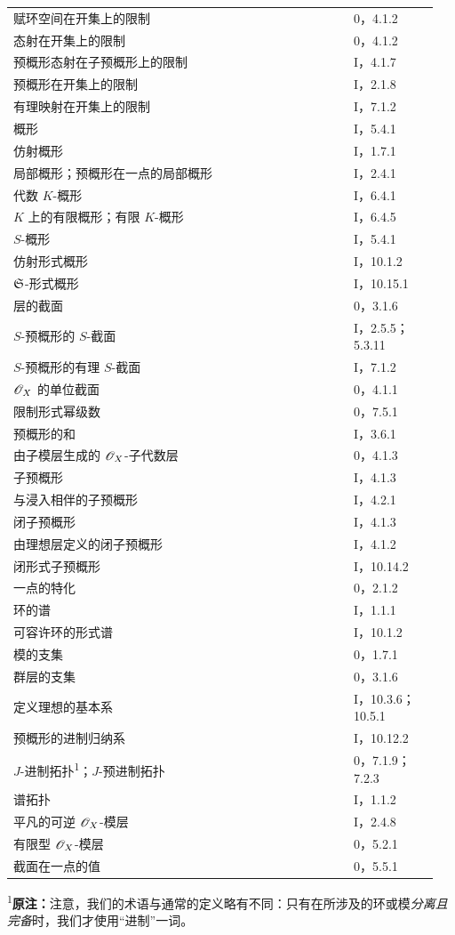 \begin{longtable}{@{}p{0.76\linewidth}p{0.19\linewidth}@{}}
赋环空间在开集上的限制&0，4.1.2\\
态射在开集上的限制&0，4.1.2\\
预概形态射在子预概形上的限制&I，4.1.7\\
预概形在开集上的限制&I，2.1.8\\
有理映射在开集上的限制&I，7.1.2\\
概形&I，5.4.1\\
仿射概形&I，1.7.1\\
局部概形；预概形在一点的局部概形&I，2.4.1\\
代数 $K$-概形&I，6.4.1\\
$K$ 上的有限概形；有限 $K$-概形&I，6.4.5\\
$S$-概形&I，5.4.1\\
仿射形式概形&I，10.1.2\\
$\mathfrak S$-形式概形&I，10.15.1\\
层的截面&0，3.1.6\\
$S$-预概形的 $S$-截面&I，2.5.5；5.3.11\\
$S$-预概形的有理 $S$-截面&I，7.1.2\\
$\mathscr O_X$ 的单位截面&0，4.1.1\\
限制形式幂级数&0，7.5.1\\
预概形的和&I，3.6.1\\
由子模层生成的 $\mathscr O_X$-子代数层&0，4.1.3\\
子预概形&I，4.1.3\\
与浸入相伴的子预概形&I，4.2.1\\
闭子预概形&I，4.1.3\\
由理想层定义的闭子预概形&I，4.1.2\\
闭形式子预概形&I，10.14.2\\
一点的特化&0，2.1.2\\
环的谱&I，1.1.1\\
可容许环的形式谱&I，10.1.2\\
模的支集&0，1.7.1\\
群层的支集&0，3.1.6\\
定义理想的基本系&I，10.3.6；10.5.1\\
预概形的进制归纳系&I，10.12.2\\
$J$-进制拓扑\textsuperscript{1}；$J$-预进制拓扑&0，7.1.9；7.2.3\\
谱拓扑&I，1.1.2\\
平凡的可逆 $\mathscr O_X$-模层&I，2.4.8\\
有限型 $\mathscr O_X$-模层&0，5.2.1\\
截面在一点的值&0，5.5.1\\
\end{longtable}
\noindent\textsuperscript{1}\textbf{原注：}注意，我们的术语与通常的定义略有不同：只有在所涉及的环或模\emph{分离且完备}时，我们才使用“进制”一词。
\endgroup


